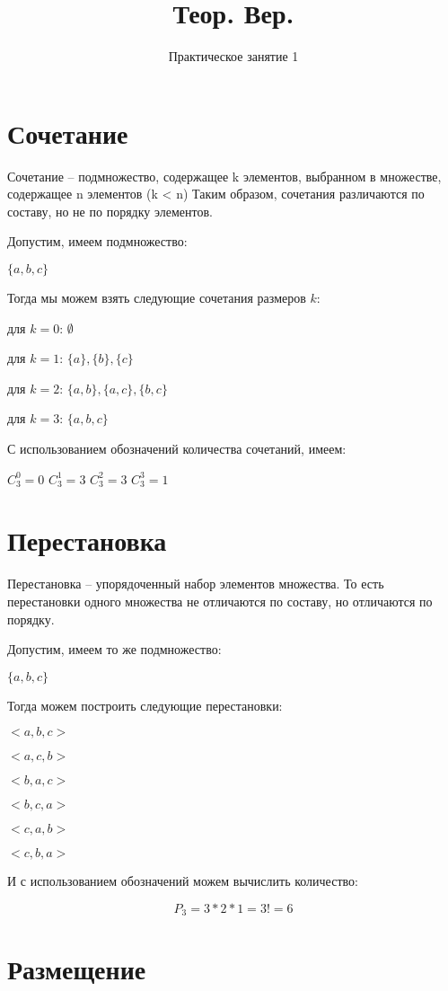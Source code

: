 \documentclass{article}
\title{Теор. Вер.}
\author{Практическое занятие 1}
\begin{document}
\maketitle
\section{Сочетание}

Сочетание -- подмножество, содержащее k элементов, выбранном в множестве, содержащее n элементов (k < n)
Таким образом, сочетания различаются по составу, но не по порядку элементов.

Допустим, имеем подмножество:

$\{a, b, c\}$

Тогда мы можем взять следующие сочетания размеров $k$:

для $k = 0$: $\emptyset$

для $k = 1$: $\{a\}, \{b\}, \{c\}$

для $k = 2$: $\{a, b\}, \{a, c\}, \{b, c\}$

для $k = 3$: $\{a, b, c\}$

С использованием обозначений количества сочетаний, имеем:

\quad$C_3^0 = 0$ \quad $C_3^1 = 3$ \quad $C_3^2 = 3$ \quad $C_3^3 = 1$

\section{Перестановка}

Перестановка -- упорядоченный набор элементов множества.
То есть перестановки одного множества не отличаются по составу, но отличаются по порядку.

Допустим, имеем то же подмножество:

$\{a, b, c\}$

Тогда можем построить следующие перестановки:

$<a, b, c>$

$<a, c, b>$

$<b, a, c>$

$<b, c, a>$

$<c, a, b>$

$<c, b, a>$

И с использованием обозначений можем вычислить количество:

$$P_3 = 3 * 2 * 1 = 3! = 6$$

\section{Размещение}
\end{document}
